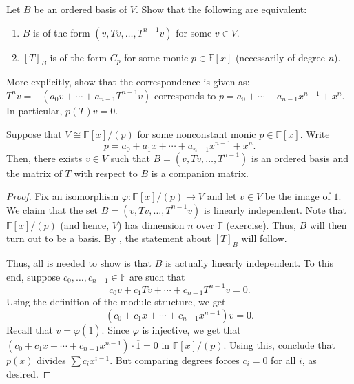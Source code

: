 \documentclass[12pt]{article}
\begin{document}
\begin{exe} \label{exe:companion-cyclic-basis}
	Let $B$ be an ordered basis of $V$. Show that the following are equivalent:
	\begin{enumerate}
		\item $B$ is of the form $(v, Tv, \ldots, T^{n - 1}v)$ for some $v \in V$.
		\item $[T]_{B}$ is of the form $C_{p}$ for some monic $p \in \mathbb{F}[x]$ (necessarily of degree $n$).
	\end{enumerate}
	More explicitly, show that the correspondence is given as: \\
	$T^{n} v = -(a_{0} v + \cdots + a_{n - 1} T^{n - 1}v)$ corresponds to $p = a_{0} + \cdots + a_{n - 1} x^{n - 1} + x^{n}$. In particular, $p(T)v = 0$.
\end{exe}

\begin{thm} \label{thm:good-basis-cyclic}
	Suppose that $V \cong \mathbb{F}[x]/(p)$ for some nonconstant monic $p \in \mathbb{F}[x]$. Write
	\begin{equation*} 
		p = a_{0} + a_{1} x + \cdots + a_{n - 1} x^{n - 1} + x^{n}.
	\end{equation*} 
	Then, there exists $v \in V$ such that $B = (v, Tv, \ldots, T^{n - 1})$ is an ordered basis and the matrix of $T$ with respect to $B$ is a companion matrix.
\end{thm}
\begin{proof} 
	Fix an isomorphism $\varphi : \mathbb{F}[x]/(p) \to V$ and let $v \in V$ be the image of $\bar{1}$. We claim that the set $B = (v, Tv, \ldots, T^{n - 1} v)$ is linearly independent. Note that $\mathbb{F}[x]/(p)$ (and hence, $V$) has dimension $n$ over $\mathbb{F}$ (exercise). Thus, $B$ will then turn out to be a basis. By , the statement about $[T]_{B}$ will follow.

	Thus, all is needed to show is that $B$ is actually linearly independent. To this end, suppose $c_{0}, \ldots, c_{n - 1} \in \mathbb{F}$ are such that
	\begin{equation*} 
		c_{0} v + c_{1} Tv + \cdots + c_{n - 1} T^{n - 1} v = 0.
	\end{equation*}
	Using the definition of the module structure, we get 
	\begin{equation*} 
		(c_{0} + c_{1} x + \cdots + c_{n - 1} x^{n - 1}) v = 0.
	\end{equation*}
	Recall that $v = \varphi(\bar{1})$. Since $\varphi$ is injective, we get that $(c_{0} + c_{1} x + \cdots + c_{n - 1} x^{n - 1}) \cdot \overline{1} = 0$ in $\mathbb{F}[x]/(p)$. Using this, conclude that $p(x)$ divides $\sum c_{i} x^{i - 1}$. But comparing degrees forces $c_{i} = 0$ for all $i$, as desired.
\end{proof}
\end{document}
